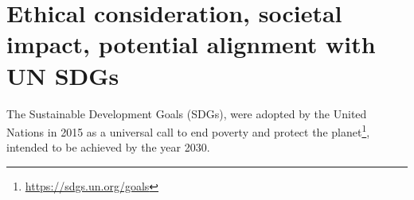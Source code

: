 \documentclass[12pt]{article}
\newcommand{\contentdescription}[1]{}
\begin{document}
    \section{Ethical consideration, societal impact, potential alignment with UN SDGs}
    \contentdescription{
        Ethical consideration, societal impact, potential alignment with UN SDGs (5-10\%):
        Think and research!
        Are there any ethical considerations for the original paper, its problem or method, its way of conducting experiments?
        How about your task, your datasets, and the experiments you did?
        What societal impact can you imagine about the original paper and its contributions and results?
        How about your project report?
        How do you think this paper can push the UN SDG targets?
    }

    The Sustainable Development Goals (SDGs), were adopted by the United Nations in 2015 as a universal call
    to end poverty and protect the planet\footnote{\url{https://sdgs.un.org/goals}}, intended to be achieved by the year 2030.
\end{document}
